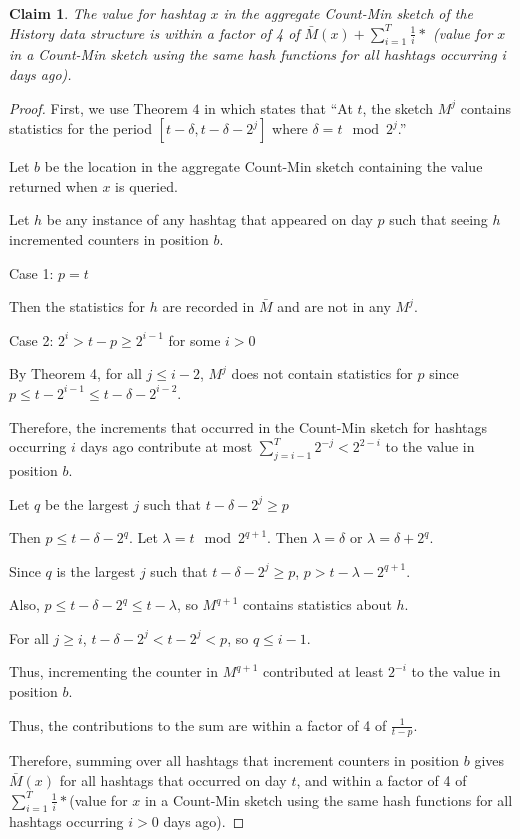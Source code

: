 \documentclass[twoside]{article}
\newtheorem{claim}{Claim}
\newcommand{\cc}[1]
 {\textbf{\cite{#1}}}
\begin{document}
\begin{claim}
The value for hashtag $x$ in the aggregate Count-Min sketch of the History data structure is within a factor of 4 of $\bar{M}(x) + \sum\limits_{i=1}^T \frac{1}{i}*$ (value for $x$ in a Count-Min sketch using the same hash functions for all hashtags occurring i days ago).
\end{claim}
\begin{proof}
First, we use Theorem $4$ in \cc{Matusevych:2012} which states that ``At $t$, the sketch $M^j$ contains statistics for the period $[t - \delta, t - \delta - 2^j]$ where $\delta = t \mod 2^j$.''

Let $b$ be the location in the aggregate Count-Min sketch containing the value returned when $x$ is queried.

Let $h$ be any instance of any hashtag that appeared on day $p$ such that seeing $h$ incremented counters in position $b$.

Case 1: $p=t$

Then the statistics for $h$ are recorded in $\bar{M}$ and are not in any $M^j$.

Case 2: $2^i > t-p \geq 2^{i-1}$ for some $i > 0$

By Theorem 4, for all $j \leq i - 2$, $M^j$ does not contain statistics for $p$ since $p \leq t - 2^{i-1} \leq t - \delta - 2^{i-2}$.

Therefore, the increments that occurred in the Count-Min sketch for hashtags occurring $i$ days ago contribute at most $\sum\limits_{j = i - 1}^{T} 2^{-j} < 2^{2-i}$ to the value in position $b$.

Let $q$ be the largest $j$ such that $t - \delta - 2^j \geq p$

Then $p \leq t - \delta - 2^q$.  Let $\lambda = t \mod 2^{q+1}$.  Then $\lambda = \delta$ or $\lambda = \delta + 2^q$.

Since $q$ is the largest $j$ such that $t - \delta - 2^j \geq p$, $p > t - \lambda - 2^{q+1}$.

Also, $p \leq t - \delta - 2^q \leq t - \lambda$, so $M^{q+1}$ contains statistics about $h$.

For all $j \geq i$, $t - \delta - 2^j < t - 2^j < p$, so $q \leq i - 1$. 

Thus, incrementing the counter in $M^{q + 1}$ contributed at least $2^{-i}$ to the value in position $b$.

Thus, the contributions to the sum are within a factor of 4 of $\frac{1}{t-p}$.

Therefore, summing over all hashtags that increment counters in position $b$ gives $\bar{M}(x)$ for all hashtags that occurred on day $t$, and within a factor of 4 of $\sum\limits_{i=1}^T \frac{1}{i}*$(value for $x$ in a Count-Min sketch using the same hash functions for all hashtags occurring $i > 0$ days ago). 
\end{proof}
\end{document}
